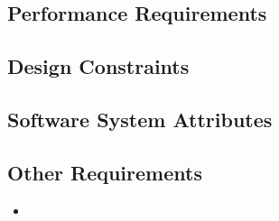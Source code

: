 \documentclass[12pt]{article}
\begin{document}
{{        \subsection{Performance Requirements}


        \subsection{Design Constraints}


        \subsection{Software System Attributes}


        \subsection{Other Requirements}
			\begin{itemize}
  				\item
			\end{itemize}
}}
\end{document}
